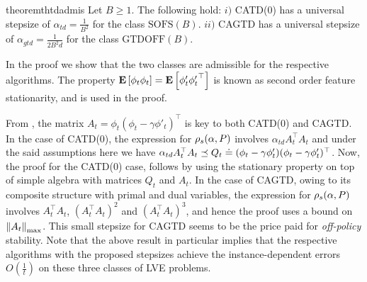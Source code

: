 \fi
\begin{restatable}{theorem}{thtdadmis}\label{th:tdadmis}
Let $B\ge 1$.
The following hold:
$i)$ CATD(0) has a universal stepsize of $\alpha_{td}=\frac{1}{B^2}$ for  the class $\text{SOFS}(B)$.
$ii)$ CAGTD has a universal stepsize of $\alpha_{gtd}=\frac{1}{2B^2 d}$ for the class $\text{GTDOFF}(B)$.
\end{restatable}
In the proof we show that the two classes are admissible for the respective algorithms.
The property $\mathbf{E}\left[\phi_t\phi_t\right]=\mathbf{E}\left[\phi'_t{\phi'_t}^\top\right]$ is known as second order feature stationarity, and is used in the proof.
\fi

From , the matrix $A_t=\phi_t(\phi_t-\gamma\phi'_t)^\top$ is key to both CATD(0) and CAGTD. In the case of CATD(0),  the expression for $\rho_s(\alpha,P)$ involves $\alpha_{td} A_t^\top A_t$ and under the said assumptions here we have $\alpha_{td} A_t^\top A_t\preceq Q_t\doteq (\phi_t-\gamma\phi'_t)(\phi_t-\gamma\phi'_t)^\top$.  Now, the proof for the CATD(0) case, follows by using the stationary property on top of simple algebra with matrices $Q_t$ and $A_t$. In the case of CAGTD, owing to its composite structure with primal and dual variables, the expression for $\rho_s(\alpha,P)$ involves $A_t^\top A_t$, $(A_t^\top A_t)^2$ and $(A_t^\top A_t)^3$, and hence the proof uses a bound on $\left\| A_t\right\|_{\max}$. This small stepsize for CAGTD seems to be the price paid for \emph{off-policy} stability. 
Note that the above result in particular implies that the respective algorithms with the proposed stepsizes achieve the instance-dependent errors $O(\frac{1}{t})$ on these three classes of LVE problems.

